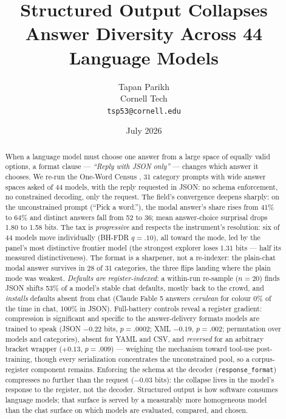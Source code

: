 \documentclass[11pt]{article}
\title{\textbf{Structured Output Collapses\\Answer Diversity Across 44 Language Models}}
\author{Tapan Parikh\\Cornell Tech\\\texttt{tsp53@cornell.edu}}
\date{July 2026}
\begin{document}
\maketitle

\begin{abstract}
\noindent
When a language model must choose one answer from a large space of equally valid options, a
format clause --- \emph{``Reply with JSON only''} --- changes which answer it chooses. We re-run
the One-Word Census \citep{parikh2026census}, 31 category prompts with wide answer spaces
asked of 44 models, with the reply requested in JSON: no schema enforcement, no constrained
decoding, only the request. The field's convergence deepens sharply: on the unconstrained
prompt (``Pick a word.''), the modal answer's share rises from 41\% to 64\% and distinct
answers fall from 52 to 36; mean answer-choice surprisal drops 1.80 to 1.58 bits. The tax is
\emph{progressive} and respects the instrument's resolution: six of 44 models move
individually (BH-FDR $q=.10$), all toward the mode, led by the panel's most distinctive
frontier model (the strongest explorer loses 1.31 bits --- half its measured
distinctiveness). The format is a sharpener, not a re-indexer: the plain-chat modal answer
survives in 28 of 31 categories, the three flips landing where the plain mode was weakest.
\emph{Defaults are register-indexed}: a within-run re-sample ($n{=}20$) finds JSON shifts 53\%
of a model's stable chat defaults, mostly back to the crowd, and \emph{installs} defaults absent
from chat (Claude Fable 5 answers \emph{cerulean} for colour 0\% of the time in chat, 100\% in
JSON). Full-battery controls reveal a register gradient: compression is significant and specific
to the answer-delivery formats models are trained to speak (JSON $-0.22$ bits, $p=.0002$;
XML $-0.19$, $p=.002$; permutation over models and categories), absent for YAML and CSV, and
\emph{reversed} for an arbitrary bracket wrapper ($+0.13$, $p=.009$) --- weighing the mechanism
toward tool-use post-training, though every serialization concentrates the unconstrained pool, so
a corpus-register component remains. Enforcing the schema at the decoder
(\texttt{response\_format}) compresses no further than the request ($-0.03$ bits): the collapse
lives in the model's response to the register, not the decoder. Structured output is
how software consumes language models; that surface is served by a measurably more homogeneous
model than the chat surface on which models are evaluated, compared, and chosen.
\end{abstract}
\end{document}

